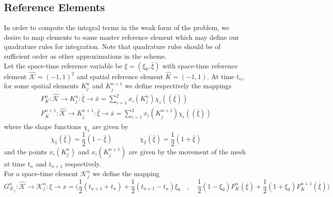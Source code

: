 \documentclass[11pt, oneside]{article}   	%
\begin{document}
%
%
\subsection{Reference Elements}
In order to compute the integral terms in the weak form of the problem, we desire to map elements to some master reference element which may define our quadrature rules for integration.
Note that quadrature rules should be of sufficient order as other approximations in the scheme.\\
Let the space-time reference variable be $\xi = (\xi_0,\bar{\xi})$ with space-time reference element $\hat{\mathcal{K}} = (-1,1)^2$ and spatial reference element $\hat{K} = (-1,1)$.
At time $t_n$, for some spatial elements $K_j^n$ and $K_j^{n+1}$ we define respectively the mappings
\begin{gather*}
F_K^n : \hat{\mathcal{K}} \rightarrow K_j^n : \bar{\xi} \rightarrow \bar{x} = \sum_{i=1}^2 x_i(K_j^n) \chi_i((\bar{\xi}))\\
F_K^{n+1} : \hat{\mathcal{K}} \rightarrow K_j^{n+1} : \bar{\xi} \rightarrow \bar{x} = \sum_{i=1}^2 x_i(K_j^{n+1}) \chi_i((\bar{\xi}))
\end{gather*}
where the shape functions $\chi_i$ are given by
\[ \chi_1(\bar{\xi}) = \frac{1}{2}(1-\bar{\xi}) \qquad\qquad \chi_2(\bar{\xi}) = \frac{1}{2}(1+\bar{\xi}) \]
and the points $x_i(K_j^n)$ and $x_i(K_j^{n+1})$ are given by the movement of the mesh at time $t_n$ and $t_{n+1}$ respectively.\\
For a space-time element $\mathcal{K}_j^n$ we define the mapping
\begin{equation*}
G_{\mathcal{K}_j}^n : \hat{\mathcal{K}} \rightarrow \mathcal{K}_j^n : \xi \rightarrow x =
\bigg( \frac{1}{2} (t_{n+1} + t_n) + \frac{1}{2} (t_{n+1} - t_n) \xi_0 \quad,\quad
\frac{1}{2} (1-\xi_0) F_K^n(\bar{\xi}) + \frac{1}{2} (1+\xi_0) F_K^{n+1}(\bar{\xi}) \bigg)
\end{equation*}


%
%
\end{document}
